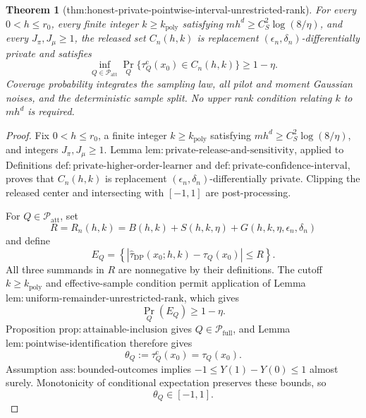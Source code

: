 \documentclass{article}
\newtheorem{theorem}{Theorem}
\begin{document}
\begin{theorem}[thm:honest-private-pointwise-interval-unrestricted-rank]\label{thm:honest-private-pointwise-interval-unrestricted-rank}
For every \(0<h\le r_0\), every finite integer \(k\ge k_{\mathrm{poly}}\) satisfying \(m h^d\ge C_S^2\log(8/\eta)\), and every \(J_\pi,J_\mu\ge1\), the released set \(C_n(h,k)\) is replacement \((\epsilon_n,\delta_n)\)-differentially private and satisfies
\[
 \inf_{Q\in\mathcal P_{\mathrm{att}}}
 \Pr_Q\{\tau_Q^{\mathrm c}(x_0)\in C_n(h,k)\}\ge1-\eta.
\]
Coverage probability integrates the sampling law, all pilot and moment Gaussian noises, and the deterministic sample split.  No upper rank condition relating \(k\) to \(m h^d\) is required.
\end{theorem}
\begin{proof}
Fix \(0<h\le r_0\), a finite integer \(k\ge k_{\mathrm{poly}}\) satisfying \(mh^d\ge C_S^2\log(8/\eta)\), and integers \(J_\pi,J_\mu\ge1\).  Lemma \(\mathrm{lem{:}private\text{-}release\text{-}and\text{-}sensitivity}\), applied to Definitions \(\mathrm{def{:}private\text{-}higher\text{-}order\text{-}learner}\) and \(\mathrm{def{:}private\text{-}confidence\text{-}interval}\), proves that \(C_n(h,k)\) is replacement \((\epsilon_n,\delta_n)\)-differentially private.  Clipping the released center and intersecting with \([-1,1]\) are post-processing.

For \(Q\in\mathcal P_{\mathrm{att}}\), set
\[
 R=R_n(h,k)=B(h,k)+S(h,k,\eta)
      +G(h,k,\eta,\epsilon_n,\delta_n)
\]
and define
\[
 E_Q=\left\{
 |\widehat\tau_{\mathrm{DP}}(x_0;h,k)-\tau_Q(x_0)|\le R
 \right\}.
\tag{1}
\]
All three summands in \(R\) are nonnegative by their definitions.  The cutoff \(k\ge k_{\mathrm{poly}}\) and effective-sample condition permit application of Lemma \(\mathrm{lem{:}uniform\text{-}remainder\text{-}unrestricted\text{-}rank}\), which gives
\[
 \Pr_Q(E_Q)\ge1-\eta.
\tag{2}
\]
Proposition \(\mathrm{prop{:}attainable\text{-}inclusion}\) gives \(Q\in\mathcal P_{\mathrm{full}}\), and Lemma \(\mathrm{lem{:}pointwise\text{-}identification}\) therefore gives
\[
 \theta_Q:=\tau_Q^{\mathrm c}(x_0)=\tau_Q(x_0).
\tag{3}
\]
Assumption \(\mathrm{ass{:}bounded\text{-}outcomes}\) implies \(-1\le Y(1)-Y(0)\le1\) almost surely.  Monotonicity of conditional expectation preserves these bounds, so
\[
 \theta_Q\in[-1,1].
\tag{4}
\]


\end{proof}
\end{document}
